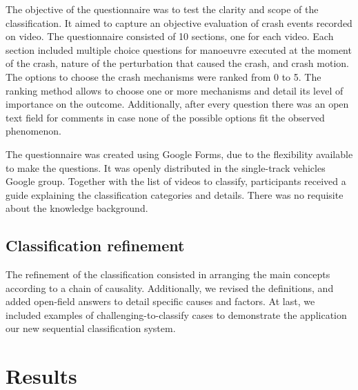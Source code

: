 \documentclass{article}
\begin{document}
The objective of the questionnaire was to test the clarity and scope of the classification.
%
It aimed to capture an objective evaluation of crash events recorded on video.
%
The questionnaire consisted of 10 sections, one for each video.
%
Each section included multiple choice questions for manoeuvre executed at the moment of the crash, nature of the perturbation that caused the crash, and crash motion.
%
The options to choose the crash mechanisms were ranked from 0 to 5.
%
The ranking method allows to choose one or more mechanisms and detail its level of importance on the outcome.
%
Additionally, after every question there was an open text field for comments in case none of the possible options fit the observed phenomenon.


The questionnaire was created using Google Forms, due to the flexibility available to make the questions.
%
It was openly distributed in the single-track vehicles Google group.
%
Together with the list of videos to classify, participants received a guide explaining the classification categories and details.
%
There was no requisite about the knowledge background.


\subsection{Classification refinement}
%
The refinement of the classification consisted in arranging the main concepts according to a chain of causality.
%
Additionally, we revised the definitions, and added open-field answers to detail specific causes and factors.
%
At last, we included examples of challenging-to-classify cases to demonstrate the application our new sequential classification system.

\section{Results} \label{sec: classification}
%
\end{document}
